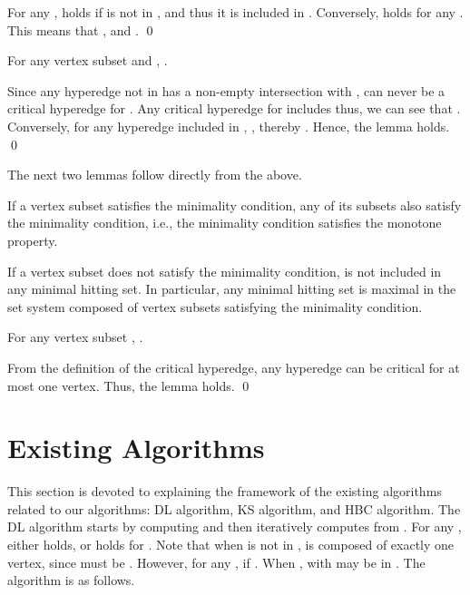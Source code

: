 \proof
For any ,  holds if  is
 not in , and thus it is included in
 .
Conversely,  holds for any .
This means that , and .
\qed

\begin{lemma}\label{up2}
For any vertex subset  and ,
 .
\end{lemma}

\proof
Since any hyperedge not in  has a non-empty intersection with ,
  can never be a critical hyperedge for .
Any critical hyperedge for  includes  thus, we can see that
 .
Conversely, for any hyperedge  included in ,
 , thereby
 .
Hence, the lemma holds.
\qed

The next two lemmas follow directly from the above.

\begin{lemma}\label{mono}\cite{HcBa07}
If a vertex subset  satisfies the minimality condition, any of its subsets also satisfy the minimality condition,
 i.e., the minimality condition satisfies the monotone property.
\end{lemma}

\begin{lemma}\label{min-cond}\cite{HcBa07}
If a vertex subset  does not satisfy the minimality condition, 
  is not included in any minimal hitting set.
In particular, any minimal hitting set  is maximal in the set system
 composed of vertex subsets satisfying the minimality condition.
\end{lemma}

\begin{lemma}\label{crit-size}
For any vertex subset , .
\end{lemma}

\proof
From the definition of the critical hyperedge, any hyperedge 
 can be critical for at most one vertex.
Thus, the lemma holds.
\qed

\section{Existing Algorithms}

This section is devoted to explaining the framework of the existing algorithms
 related to our algorithms: DL algorithm, KS algorithm, and HBC algorithm.
The DL algorithm starts by computing  and then
 iteratively computes  from .
For any , either  holds,
 or  holds for .
Note that when  is not in ,
  is composed of exactly one vertex, since  must be
 .
However, for any ,  if
 .
When ,  with  may be in
 .
The algorithm is as follows.

